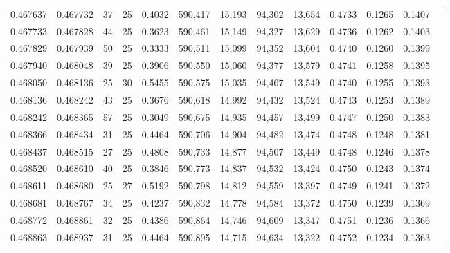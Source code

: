 \begin{tabular}{rrrrrrrrrrrrr}
0.467637 & 0.467732 &    37 &  25 &                                     0.4032 & 590,417 &  15,193 &  94,302 &  13,654 & 0.4733 & 0.1265 & 0.1407 \\
0.467733 & 0.467828 &    44 &  25 &                                     0.3623 & 590,461 &  15,149 &  94,327 &  13,629 & 0.4736 & 0.1262 & 0.1403 \\
0.467829 & 0.467939 &    50 &  25 &                                     0.3333 & 590,511 &  15,099 &  94,352 &  13,604 & 0.4740 & 0.1260 & 0.1399 \\
0.467940 & 0.468048 &    39 &  25 &                                     0.3906 & 590,550 &  15,060 &  94,377 &  13,579 & 0.4741 & 0.1258 & 0.1395 \\
0.468050 & 0.468136 &    25 &  30 &                                     0.5455 & 590,575 &  15,035 &  94,407 &  13,549 & 0.4740 & 0.1255 & 0.1393 \\
0.468136 & 0.468242 &    43 &  25 &                                     0.3676 & 590,618 &  14,992 &  94,432 &  13,524 & 0.4743 & 0.1253 & 0.1389 \\
0.468242 & 0.468365 &    57 &  25 &                                     0.3049 & 590,675 &  14,935 &  94,457 &  13,499 & 0.4747 & 0.1250 & 0.1383 \\
0.468366 & 0.468434 &    31 &  25 &                                     0.4464 & 590,706 &  14,904 &  94,482 &  13,474 & 0.4748 & 0.1248 & 0.1381 \\
0.468437 & 0.468515 &    27 &  25 &                                     0.4808 & 590,733 &  14,877 &  94,507 &  13,449 & 0.4748 & 0.1246 & 0.1378 \\
0.468520 & 0.468610 &    40 &  25 &                                     0.3846 & 590,773 &  14,837 &  94,532 &  13,424 & 0.4750 & 0.1243 & 0.1374 \\
0.468611 & 0.468680 &    25 &  27 &                                     0.5192 & 590,798 &  14,812 &  94,559 &  13,397 & 0.4749 & 0.1241 & 0.1372 \\
0.468681 & 0.468767 &    34 &  25 &                                     0.4237 & 590,832 &  14,778 &  94,584 &  13,372 & 0.4750 & 0.1239 & 0.1369 \\
0.468772 & 0.468861 &    32 &  25 &                                     0.4386 & 590,864 &  14,746 &  94,609 &  13,347 & 0.4751 & 0.1236 & 0.1366 \\
0.468863 & 0.468937 &    31 &  25 &                                     0.4464 & 590,895 &  14,715 &  94,634 &  13,322 & 0.4752 & 0.1234 & 0.1363 \\

\end{tabular}
